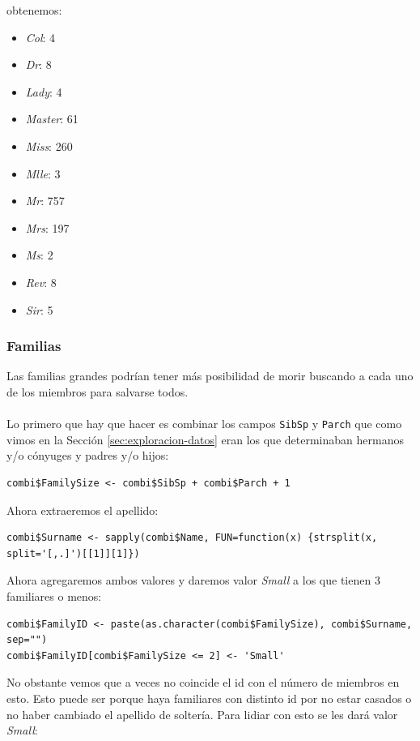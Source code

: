 obtenemos:

\begin{itemize}
	\item \textit{Col}: 4
	\item \textit{Dr}: 8
	\item \textit{Lady}: 4
	\item \textit{Master}: 61
	\item \textit{Miss}: 260
	\item \textit{Mlle}: 3
	\item \textit{Mr}: 757
	\item \textit{Mrs}: 197
	\item \textit{Ms}: 2
	\item \textit{Rev}: 8
	\item \textit{Sir}: 5
\end{itemize}

\subsubsection{Familias}

Las familias grandes podrían tener más posibilidad de morir buscando a cada uno de los miembros para salvarse todos.
\\ \\
Lo primero que hay que hacer es combinar los campos \texttt{SibSp} y \texttt{Parch} que como vimos en la Sección \ref{sec:exploracion-datos} eran los que determinaban hermanos y/o cónyuges y padres y/o hijos:

\begin{lstlisting}[style=R]
combi$FamilySize <- combi$SibSp + combi$Parch + 1
\end{lstlisting}

Ahora extraeremos el apellido:

\begin{lstlisting}[style=R]
combi$Surname <- sapply(combi$Name, FUN=function(x) {strsplit(x, split='[,.]')[[1]][1]})
\end{lstlisting}

Ahora agregaremos ambos valores y daremos valor \textit{Small} a los que tienen 3 familiares o menos:

\begin{lstlisting}[style=R]
combi$FamilyID <- paste(as.character(combi$FamilySize), combi$Surname, sep="")
combi$FamilyID[combi$FamilySize <= 2] <- 'Small'
\end{lstlisting}

No obstante vemos que a veces no coincide el id con el número de miembros en esto. Esto puede ser porque haya familiares con distinto id por no estar casados o no haber cambiado el apellido de soltería. Para lidiar con esto se les dará valor \textit{Small}:

